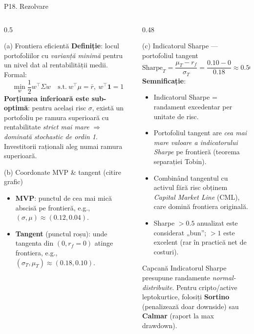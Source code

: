 \documentclass[9pt, aspectratio=169, t]{beamer}
\begin{document}
\begin{frame}[shrink=22]{P18. Rezolvare}
\begin{columns}[T]
\begin{column}{0.5\textwidth}
\begin{block}{(a) Frontiera eficientă}
\textbf{Definiție}: locul portofoliilor cu \emph{varianță minimă} pentru un nivel dat al rentabilității medii. Formal:
\[
\min_w \frac{1}{2} w^\top \Sigma w \quad\text{s.t.}\ w^\top \mu = \bar r,\ w^\top \mathbf{1}=1
\]
\textbf{Porțiunea inferioară este sub-optimă}: pentru același risc $\sigma$, există un portofoliu pe ramura superioară cu rentabilitate \emph{strict mai mare} $\Rightarrow$ \emph{dominată stochastic de ordin 1}. Investitorii raționali aleg numai ramura superioară.
\end{block}
\begin{block}{(b) Coordonate MVP \& tangent (citire grafic)}
\begin{itemize}\setlength{\itemsep}{0pt}
    \item \textbf{MVP}: punctul de cea mai mică abscisă pe frontieră, e.g., $(\sigma, \mu)\approx(0.12, 0.04)$.
    \item \textbf{Tangent} (punctul roșu): unde tangenta din $(0, r_f=0)$ atinge frontiera, e.g., $(\sigma_T, \mu_T)\approx(0.18, 0.10)$.
\end{itemize}
\end{block}
\end{column}
\begin{column}{0.48\textwidth}
\begin{block}{(c) Indicatorul Sharpe --- portofoliul tangent}
\[
\text{Sharpe}_T = \frac{\mu_T - r_f}{\sigma_T} = \frac{0.10 - 0}{0.18} \approx \mathbf{0.56}
\]
\textbf{Semnificație}:
\begin{itemize}\setlength{\itemsep}{0pt}
\item Indicatorul Sharpe = randament excedentar per unitate de risc.
\item Portofoliul tangent are \emph{cea mai mare valoare a indicatorului Sharpe} pe frontieră (teorema separației Tobin).
\item Combinând tangentul cu activul fără risc obținem \emph{Capital Market Line} (CML), care domină frontiera originală.
\item Sharpe $>0.5$ anualizat este considerat „bun''; $>1$ este excelent (rar în practică net de costuri).
\end{itemize}
\end{block}
\begin{alertblock}{Capcană}
Indicatorul Sharpe presupune randamente \emph{normal-distribuite}. Pentru cripto/active leptokurtice, folosiți \textbf{Sortino} (penalizează doar downside) sau \textbf{Calmar} (raport la max drawdown).
\end{alertblock}
\end{column}
\end{columns}
\end{frame}
\end{document}
